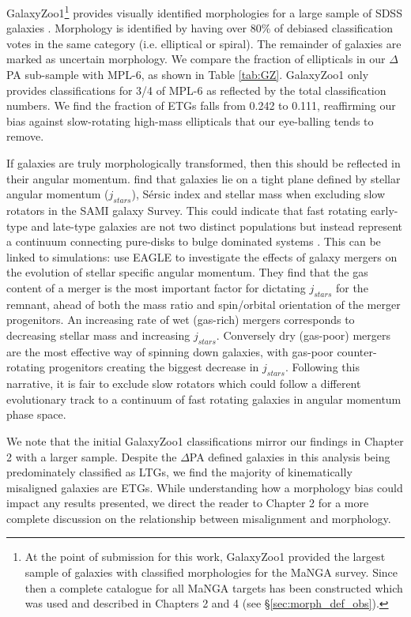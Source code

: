 GalaxyZoo1\footnote{At the point of submission for this work, GalaxyZoo1 provided the largest sample of galaxies with classified morphologies for the MaNGA survey. Since then a complete catalogue for all MaNGA targets has been constructed which was used and described in Chapters 2 and 4 (see \S\ref{sec:morph_def_obs}).} provides visually identified morphologies for a large sample of SDSS galaxies \citep{lintott2008}. Morphology is identified by having over 80\% of debiased classification votes in the same category (i.e. elliptical or spiral). The remainder of galaxies are marked as uncertain morphology. We compare the fraction of ellipticals in our $\Delta$PA sub-sample with MPL-6, as shown in Table \ref{tab:GZ}. GalaxyZoo1 only provides classifications for 3/4 of MPL-6 as reflected by the total classification numbers. We find the fraction of ETGs falls from 0.242 to 0.111, reaffirming our bias against slow-rotating high-mass ellipticals that our eye-balling tends to remove. 

If galaxies are truly morphologically transformed, then this should be reflected in their angular momentum. \citet{cortese2016} find that galaxies lie on a tight plane defined by stellar angular momentum ($j_{stars}$), S\'ersic index and stellar mass when excluding slow rotators in the SAMI galaxy Survey. This could indicate that fast rotating early-type and late-type galaxies are not two distinct populations but instead represent a continuum connecting pure-disks to bulge dominated systems \citep{cappellari2011}. This can be linked to simulations: \citet{lagos2017} use EAGLE \citep{EAGLE2015} to investigate the effects of galaxy mergers on the evolution of stellar specific angular momentum. They find that the gas content of a merger is the most important factor for dictating $j_{stars}$ for the remnant, ahead of both the mass ratio and spin/orbital orientation of the merger progenitors. An increasing rate of wet (gas-rich) mergers corresponds to decreasing stellar mass and increasing $j_{stars}$. Conversely dry (gas-poor) mergers are the most effective way of spinning down galaxies, with gas-poor counter-rotating progenitors creating the biggest decrease in $j_{stars}$. Following this narrative, it is fair to exclude slow rotators which could follow a different evolutionary track to a continuum of fast rotating galaxies in angular momentum phase space. 

We note that the initial GalaxyZoo1 classifications mirror our findings in Chapter 2 with a larger sample. Despite the $\Delta$PA defined galaxies in this analysis being predominately classified as LTGs, we find the majority of kinematically misaligned galaxies are ETGs. While understanding how a morphology bias could impact any results presented, we direct the reader to Chapter 2 for a more complete discussion on the relationship between misalignment and morphology.

